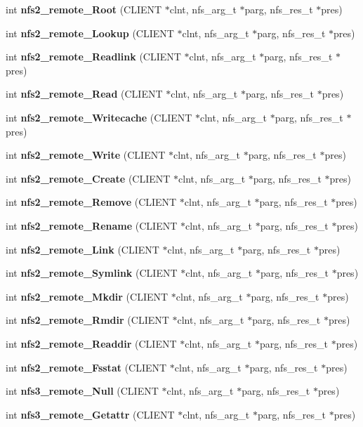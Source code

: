 \begin{CompactItemize}
\item 
int {\bf nfs2\_\-remote\_\-Root} (CLIENT $\ast$clnt, nfs\_\-arg\_\-t $\ast$parg, nfs\_\-res\_\-t $\ast$pres)
\item 
int {\bf nfs2\_\-remote\_\-Lookup} (CLIENT $\ast$clnt, nfs\_\-arg\_\-t $\ast$parg, nfs\_\-res\_\-t $\ast$pres)
\item 
int {\bf nfs2\_\-remote\_\-Readlink} (CLIENT $\ast$clnt, nfs\_\-arg\_\-t $\ast$parg, nfs\_\-res\_\-t $\ast$pres)
\item 
int {\bf nfs2\_\-remote\_\-Read} (CLIENT $\ast$clnt, nfs\_\-arg\_\-t $\ast$parg, nfs\_\-res\_\-t $\ast$pres)
\item 
int {\bf nfs2\_\-remote\_\-Writecache} (CLIENT $\ast$clnt, nfs\_\-arg\_\-t $\ast$parg, nfs\_\-res\_\-t $\ast$pres)
\item 
int {\bf nfs2\_\-remote\_\-Write} (CLIENT $\ast$clnt, nfs\_\-arg\_\-t $\ast$parg, nfs\_\-res\_\-t $\ast$pres)
\item 
int {\bf nfs2\_\-remote\_\-Create} (CLIENT $\ast$clnt, nfs\_\-arg\_\-t $\ast$parg, nfs\_\-res\_\-t $\ast$pres)
\item 
int {\bf nfs2\_\-remote\_\-Remove} (CLIENT $\ast$clnt, nfs\_\-arg\_\-t $\ast$parg, nfs\_\-res\_\-t $\ast$pres)
\item 
int {\bf nfs2\_\-remote\_\-Rename} (CLIENT $\ast$clnt, nfs\_\-arg\_\-t $\ast$parg, nfs\_\-res\_\-t $\ast$pres)
\item 
int {\bf nfs2\_\-remote\_\-Link} (CLIENT $\ast$clnt, nfs\_\-arg\_\-t $\ast$parg, nfs\_\-res\_\-t $\ast$pres)
\item 
int {\bf nfs2\_\-remote\_\-Symlink} (CLIENT $\ast$clnt, nfs\_\-arg\_\-t $\ast$parg, nfs\_\-res\_\-t $\ast$pres)
\item 
int {\bf nfs2\_\-remote\_\-Mkdir} (CLIENT $\ast$clnt, nfs\_\-arg\_\-t $\ast$parg, nfs\_\-res\_\-t $\ast$pres)
\item 
int {\bf nfs2\_\-remote\_\-Rmdir} (CLIENT $\ast$clnt, nfs\_\-arg\_\-t $\ast$parg, nfs\_\-res\_\-t $\ast$pres)
\item 
int {\bf nfs2\_\-remote\_\-Readdir} (CLIENT $\ast$clnt, nfs\_\-arg\_\-t $\ast$parg, nfs\_\-res\_\-t $\ast$pres)
\item 
int {\bf nfs2\_\-remote\_\-Fsstat} (CLIENT $\ast$clnt, nfs\_\-arg\_\-t $\ast$parg, nfs\_\-res\_\-t $\ast$pres)
\item 
int {\bf nfs3\_\-remote\_\-Null} (CLIENT $\ast$clnt, nfs\_\-arg\_\-t $\ast$parg, nfs\_\-res\_\-t $\ast$pres)
\item 
int {\bf nfs3\_\-remote\_\-Getattr} (CLIENT $\ast$clnt, nfs\_\-arg\_\-t $\ast$parg, nfs\_\-res\_\-t $\ast$pres)

\end{CompactItemize}
